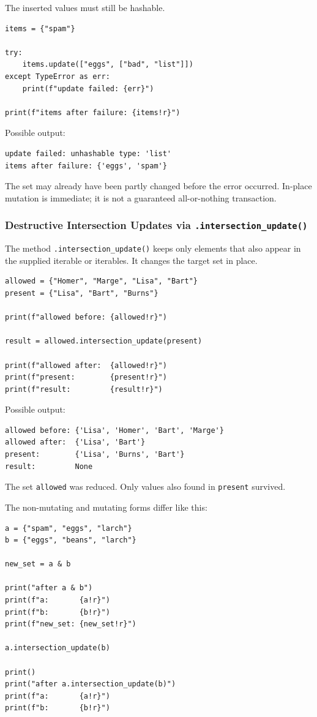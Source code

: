 The inserted values must still be hashable.

\begin{verbatim}
items = {"spam"}

try:
    items.update(["eggs", ["bad", "list"]])
except TypeError as err:
    print(f"update failed: {err}")

print(f"items after failure: {items!r}")
\end{verbatim}

Possible output:

\begin{verbatim}
update failed: unhashable type: 'list'
items after failure: {'eggs', 'spam'}
\end{verbatim}

The set may already have been partly changed before the error occurred. In-place mutation is immediate; it is not a guaranteed all-or-nothing transaction.

\subsubsection{Destructive Intersection Updates via \texttt{.intersection\_update()}}

The method \texttt{.intersection\_update()} keeps only elements that also appear in the supplied iterable or iterables. It changes the target set in place.

\begin{verbatim}
allowed = {"Homer", "Marge", "Lisa", "Bart"}
present = {"Lisa", "Bart", "Burns"}

print(f"allowed before: {allowed!r}")

result = allowed.intersection_update(present)

print(f"allowed after:  {allowed!r}")
print(f"present:        {present!r}")
print(f"result:         {result!r}")
\end{verbatim}

Possible output:

\begin{verbatim}
allowed before: {'Lisa', 'Homer', 'Bart', 'Marge'}
allowed after:  {'Lisa', 'Bart'}
present:        {'Lisa', 'Burns', 'Bart'}
result:         None
\end{verbatim}

The set \texttt{allowed} was reduced. Only values also found in \texttt{present} survived.

The non-mutating and mutating forms differ like this:

\begin{verbatim}
a = {"spam", "eggs", "larch"}
b = {"eggs", "beans", "larch"}

new_set = a & b

print("after a & b")
print(f"a:       {a!r}")
print(f"b:       {b!r}")
print(f"new_set: {new_set!r}")

a.intersection_update(b)

print()
print("after a.intersection_update(b)")
print(f"a:       {a!r}")
print(f"b:       {b!r}")
\end{verbatim}

